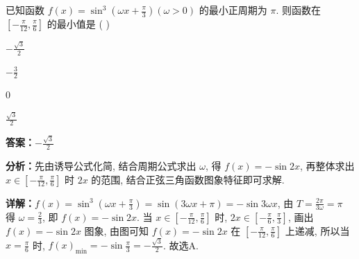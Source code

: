 \begin{question}[points=5]
已知函数 $f(x)=\sin^3\left(\omega x + \frac{\pi}{3}\right) (\omega>0)$ 的最小正周期为 $\pi$. 则函数在 $\left[-\frac{\pi}{12},\frac{\pi}{6}\right]$ 的最小值是 ( )
\begin{choices}
  \item $-\frac{\sqrt{3}}{2}$
  \item $-\frac{3}{2}$
  \item $0$
  \item $\frac{\sqrt{3}}{2}$
\end{choices}
\begin{solution}
\textbf{答案：}$-\frac{\sqrt{3}}{2}$

\textbf{分析：}先由诱导公式化简, 结合周期公式求出 $\omega$, 得 $f(x)=-\sin 2x$, 再整体求出 $x\in\left[-\frac{\pi}{12},\frac{\pi}{6}\right]$ 时 $2x$ 的范围, 结合正弦三角函数图象特征即可求解.

\textbf{详解：}$f(x)=\sin^3\left(\omega x+\frac{\pi}{3}\right)=\sin(3\omega x+\pi)=-\sin 3\omega x$, 由 $T=\frac{2\pi}{3\omega}=\pi$ 得 $\omega=\frac{2}{3}$, 即 $f(x)=-\sin 2x$. 当 $x\in\left[-\frac{\pi}{12},\frac{\pi}{6}\right]$ 时, $2x\in\left[-\frac{\pi}{6},\frac{\pi}{3}\right]$, 画出 $f(x)=-\sin 2x$ 图象, 由图可知 $f(x)=-\sin 2x$ 在 $\left[-\frac{\pi}{12},\frac{\pi}{6}\right]$ 上递减, 所以当 $x=\frac{\pi}{6}$ 时, $f(x)_{\min}=-\sin\frac{\pi}{3}=-\frac{\sqrt{3}}{2}$. 故选A.
\end{solution}
\end{question}

